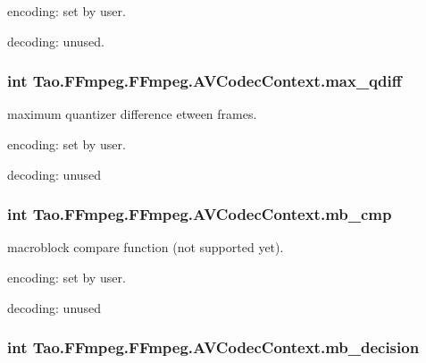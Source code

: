 \begin{DoxyItemize}
\item encoding: set by user.
\item decoding: unused. 
\end{DoxyItemize}\hypertarget{struct_tao_1_1_f_fmpeg_1_1_f_fmpeg_1_1_a_v_codec_context_a17db1bc5bee6035b99977af96f626d2c}{
\subsubsection[{max\_\-qdiff}]{\setlength{\rightskip}{0pt plus 5cm}int {\bf Tao.FFmpeg.FFmpeg.AVCodecContext.max\_\-qdiff}}}
\label{struct_tao_1_1_f_fmpeg_1_1_f_fmpeg_1_1_a_v_codec_context_a17db1bc5bee6035b99977af96f626d2c}
maximum quantizer difference etween frames.
\begin{DoxyItemize}
\item encoding: set by user.
\item decoding: unused 
\end{DoxyItemize}\hypertarget{struct_tao_1_1_f_fmpeg_1_1_f_fmpeg_1_1_a_v_codec_context_abda1de282e80667e4582ee3b100d40e3}{
\subsubsection[{mb\_\-cmp}]{\setlength{\rightskip}{0pt plus 5cm}int {\bf Tao.FFmpeg.FFmpeg.AVCodecContext.mb\_\-cmp}}}
\label{struct_tao_1_1_f_fmpeg_1_1_f_fmpeg_1_1_a_v_codec_context_abda1de282e80667e4582ee3b100d40e3}
macroblock compare function (not supported yet).
\begin{DoxyItemize}
\item encoding: set by user.
\item decoding: unused 
\end{DoxyItemize}\hypertarget{struct_tao_1_1_f_fmpeg_1_1_f_fmpeg_1_1_a_v_codec_context_aa1415ee4b953c21e30ebcc8f87716f2f}{
\subsubsection[{mb\_\-decision}]{\setlength{\rightskip}{0pt plus 5cm}int {\bf Tao.FFmpeg.FFmpeg.AVCodecContext.mb\_\-decision}}}

